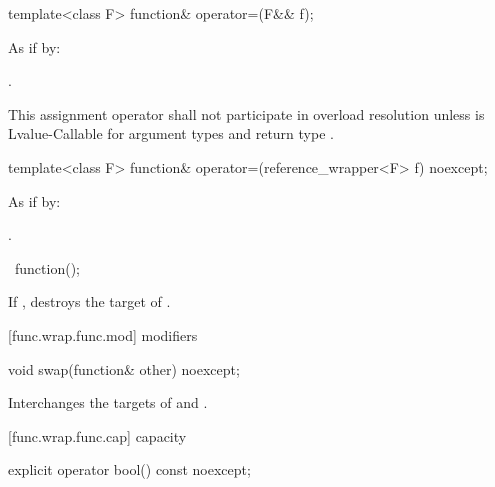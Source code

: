 %
\begin{itemdecl}
template<class F> function& operator=(F&& f);
\end{itemdecl}

\begin{itemdescr}
\pnum\effects As if by: 

\pnum\returns {}.

\pnum\remarks This assignment operator shall not participate in overload
resolution unless  is
Lvalue-Callable for argument types  and
return type .
\end{itemdescr}

%
\begin{itemdecl}
template<class F> function& operator=(reference_wrapper<F> f) noexcept;
\end{itemdecl}

\begin{itemdescr}
\pnum\effects As if by: 

\pnum
\returns {}.
\end{itemdescr}

%
\begin{itemdecl}
~function();
\end{itemdecl}

\begin{itemdescr}
\pnum\effects If , destroys the target of .
\end{itemdescr}

[func.wrap.func.mod]{ modifiers}

%
\begin{itemdecl}
void swap(function& other) noexcept;
\end{itemdecl}

\begin{itemdescr}
\pnum\effects Interchanges the targets of  and .
\end{itemdescr}

[func.wrap.func.cap]{ capacity}

%
\begin{itemdecl}
explicit operator bool() const noexcept;
\end{itemdecl}


